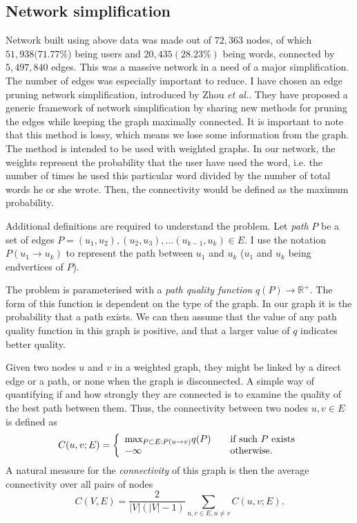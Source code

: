   \subsection{Network simplification}

    Network built using above data was made out of $72,363$ nodes, of which $51,938 (71.77\%$) being users and $20,435 (28.23\%)$ being words, connected by $5,497,840$ edges. This was a massive network in a need of a major simplification. The number of edges was especially important to reduce. I have chosen an edge pruning network simplification, introduced by Zhou \textit{et al.}\cite{ZhouMahlerToivonen2012}. They have proposed a generic framework of network simplification by sharing new methods for pruning the edges while keeping the graph maximally connected. It is important to note that this method is lossy, which means we lose some information from the graph. The method is intended to be used with weighted graphs. In our network, the weights represent the probability that the user have used the word, i.e. the number of times he used this particular word divided by the number of total words he or she wrote. Then, the connectivity would be defined as the maximum probability.
    
    Additional definitions are required to understand the problem. Let \emph{path} $P$ be a set of edges $P = {(u_1, u_2), (u_2, u_3), \ldots (u_{k-1}, u_k)} \in E$. I use the notation $P(u_1 \to u_k)$ to represent the path between $u_1$ and $u_k$ ($u_1$ and $u_k$ being endvertices of $P$).
  
    The problem is parameterised with a \emph{path quality function} $q(P) \to \mathbb{R}^+$. The form of this function is dependent on the type of the graph. In our graph it is the probability that a path exists. We can then assume that the value of any path quality function in this graph is positive, and that a larger value of $q$ indicates better quality.
    
    Given two nodes $u$ and $v$ in a weighted graph, they might be linked by a direct edge or a path, or none when the graph is disconnected. A simple way of quantifying if and how strongly they are connected is to examine the quality of the best path between them\cite{ToivonenMahlerZhou2010}. Thus, the connectivity between two nodes $u, v \in E$ is defined as
    \begin{equation}
      C(u, v; E) = \left\{
      \begin{array}{l l}
        \mbox{max}_{P \subset E: P(u \to v)} q(P) & \quad \text{if such $P$ exists}\\
        -\infty & \quad \text{otherwise.}
      \end{array}
      \right.
    \end{equation}
    A natural measure for the \emph{connectivity} of this graph is then the average connectivity over all pairs of nodes
    \begin{equation}
    C(V, E) = \frac{2}{|V|(|V|-1)} \sum_{u, v\in E, u \neq v} C(u, v; E) \mbox{.}
    \end{equation}
    
